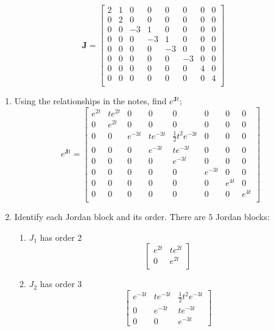 \documentclass{article}
\begin{document}
$$
\mathbf{J}
=
\begin{bmatrix}
2 & 1 & 0 & 0 & 0 & 0 & 0 & 0 \\
0 & 2 & 0 & 0 & 0 & 0 & 0 & 0 \\
0 & 0 & -3& 1 & 0 & 0 & 0 & 0 \\
0 & 0 & 0 & -3& 1 & 0 & 0 & 0 \\
0 & 0 & 0 & 0 & -3& 0 & 0 & 0 \\
0 & 0 & 0 & 0 & 0 & -3& 0 & 0 \\
0 & 0 & 0 & 0 & 0 & 0 & 4 & 0 \\
0 & 0 & 0 & 0 & 0 & 0 & 0 & 4 \\
\end{bmatrix}
$$
\begin{enumerate}[1.]
\item Using the relationships in the notes, find $e^{\mathbf{J}t}$;
$$
e^{\mathbf{J}t}
=
\begin{bmatrix}
e^{2t} & te^{2t} & 0 & 0 & 0 & 0 & 0 & 0 \\
0 & e^{2t} & 0 & 0 & 0 & 0 & 0 & 0 \\
0 & 0 & e^{-3t}& te^{-3t} & \frac{1}{2}t^2e^{-3t} & 0 & 0 & 0 \\
0 & 0 & 0 & e^{-3t}& te^{-3t} & 0 & 0 & 0 \\
0 & 0 & 0 & 0 & e^{-3t}& 0 & 0 & 0 \\
0 & 0 & 0 & 0 & 0 & e^{-3t}& 0 & 0 \\
0 & 0 & 0 & 0 & 0 & 0 & e^{4t} & 0 \\
0 & 0 & 0 & 0 & 0 & 0 & 0 & e^{4t} \\
\end{bmatrix}
$$
\newline
\item Identify each Jordan block and its order.
\newline
There are $5$ Jordan blocks:
\begin{enumerate}[1.]
\item $J_1$ has order 2
$$
\begin{bmatrix}
e^{2t} & te^{2t} \\
0 & e^{2t} \\
\end{bmatrix}
$$

\item $J_2$ has order $3$
$$
\begin{bmatrix}
e^{-3t}& te^{-3t} & \frac{1}{2}t^2e^{-3t} \\
0 & e^{-3t}& te^{-3t} \\
0 & 0 & e^{-3t}
\end{bmatrix}
$$


\end{enumerate}
\end{enumerate}
\end{document}
